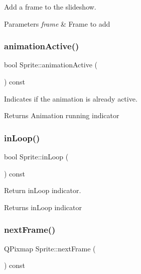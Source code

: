 Add a frame to the slideshow. 


\begin{DoxyParams}{Parameters}
{\em frame} & Frame to add \\
\hline
\end{DoxyParams}
\mbox{\label{class_sprite_aaf6364fea1ba44d95134a34ebd449c6b}} 
\subsubsection{\texorpdfstring{animation\+Active()}{animationActive()}}
{\footnotesize\ttfamily bool Sprite\+::animation\+Active (\begin{DoxyParamCaption}{ }\end{DoxyParamCaption}) const}



Indicates if the animation is already active. 

\begin{DoxyReturn}{Returns}
Animation running indicator 
\end{DoxyReturn}
\mbox{\label{class_sprite_aa43fae53d9d60a1d86096b781135f380}} 
\subsubsection{\texorpdfstring{in\+Loop()}{inLoop()}}
{\footnotesize\ttfamily bool Sprite\+::in\+Loop (\begin{DoxyParamCaption}{ }\end{DoxyParamCaption}) const}



Return in\+Loop indicator. 

\begin{DoxyReturn}{Returns}
in\+Loop indicator 
\end{DoxyReturn}
\mbox{\label{class_sprite_a01919084b25446f54dc120264d1715db}} 
\subsubsection{\texorpdfstring{next\+Frame()}{nextFrame()}}
{\footnotesize\ttfamily Q\+Pixmap Sprite\+::next\+Frame (\begin{DoxyParamCaption}{ }\end{DoxyParamCaption}) const}



